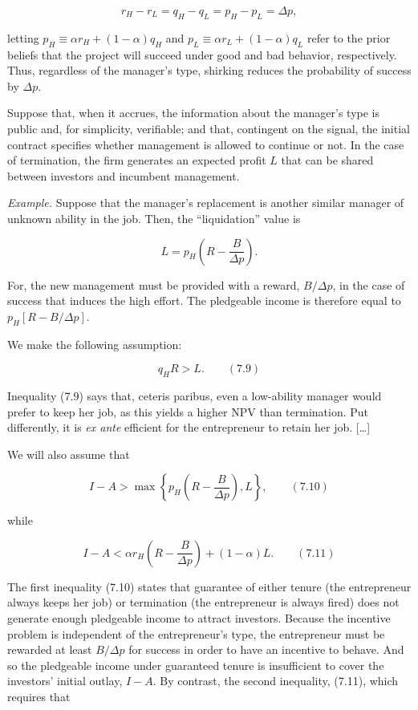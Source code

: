 \documentclass[11pt,a4paper]{article}
\begin{document}
\[r_H - r_L = q_H - q_L = p_H - p_L = \Delta p,\]

letting \(p_H \equiv \alpha r_H + (1 - \alpha) q_H\) and
\(p_L \equiv \alpha r_L + (1 - \alpha) q_L\) refer to the prior beliefs that the project will
succeed under good and bad behavior, respectively. Thus, regardless of the manager's type, shirking
reduces the probability of success by \(\Delta p\).

Suppose that, when it accrues, the information about the manager's type is public and, for
simplicity, verifiable; and that, contingent on the signal, the initial contract specifies whether
management is allowed to continue or not. In the case of termination, the firm generates an expected
profit \(L\) that can be shared between investors and incumbent management.

\emph{Example.} Suppose that the manager's replacement is another similar manager of unknown ability
in the job. Then, the ``liquidation'' value is

\[L = p_H\left(R - \frac{B}{\Delta p}\right).\]

For, the new management must be provided with a reward, \(B/\Delta p\), in the case of success that
induces the high effort. The pledgeable income is therefore equal to \(p_H[R - B/\Delta p]\).

We make the following assumption:

\[q_H R > L. \qquad (7.9)\]

Inequality (7.9) says that, ceteris paribus, even a low-ability manager would prefer to keep her
job, as this yields a higher NPV than termination. Put differently, it is \emph{ex ante} efficient
for the entrepreneur to retain her job. {[}\ldots{]}

We will also assume that

\[I - A > \max\left\{p_H\left(R - \frac{B}{\Delta p}\right), L\right\}, \qquad (7.10)\]

while

\[I - A < \alpha r_H\left(R - \frac{B}{\Delta p}\right) + (1 - \alpha)L. \qquad (7.11)\]

The first inequality (7.10) states that guarantee of either tenure (the entrepreneur always keeps
her job) or termination (the entrepreneur is always fired) does not generate enough pledgeable
income to attract investors. Because the incentive problem is independent of the entrepreneur's
type, the entrepreneur must be rewarded at least \(B/\Delta p\) for success in order to have an
incentive to behave. And so the pledgeable income under guaranteed tenure is insufficient to cover
the investors' initial outlay, \(I - A\). By contrast, the second inequality, (7.11), which requires
that
\end{document}
